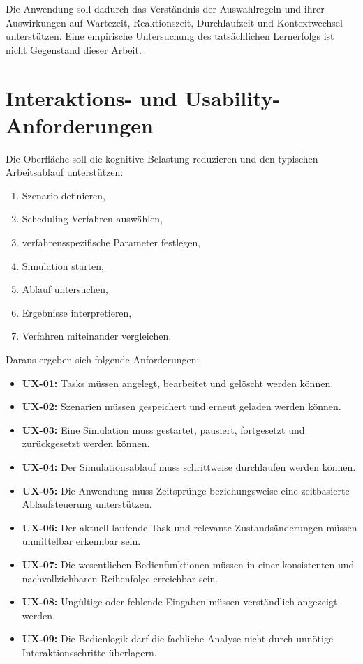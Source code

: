 Die Anwendung soll dadurch das Verständnis der Auswahlregeln und ihrer Auswirkungen auf Wartezeit, Reaktionszeit, Durchlaufzeit und Kontextwechsel unterstützen. Eine empirische Untersuchung des tatsächlichen Lernerfolgs ist nicht Gegenstand dieser Arbeit.

\section{Interaktions- und Usability-Anforderungen}

Die Oberfläche soll die kognitive Belastung reduzieren und den typischen Arbeitsablauf unterstützen:

\begin{enumerate}
    \item Szenario definieren,
    \item Scheduling-Verfahren auswählen,
    \item verfahrensspezifische Parameter festlegen,
    \item Simulation starten,
    \item Ablauf untersuchen,
    \item Ergebnisse interpretieren,
    \item Verfahren miteinander vergleichen.
\end{enumerate}

Daraus ergeben sich folgende Anforderungen:

\begin{itemize}
    \item \textbf{UX-01:} Tasks müssen angelegt, bearbeitet und gelöscht werden können.
    \item \textbf{UX-02:} Szenarien müssen gespeichert und erneut geladen werden können.
    \item \textbf{UX-03:} Eine Simulation muss gestartet, pausiert, fortgesetzt und zurückgesetzt werden können.
    \item \textbf{UX-04:} Der Simulationsablauf muss schrittweise durchlaufen werden können.
    \item \textbf{UX-05:} Die Anwendung muss Zeitsprünge beziehungsweise eine zeitbasierte Ablaufsteuerung unterstützen.
    \item \textbf{UX-06:} Der aktuell laufende Task und relevante Zustandsänderungen müssen unmittelbar erkennbar sein.
    \item \textbf{UX-07:} Die wesentlichen Bedienfunktionen müssen in einer konsistenten und nachvollziehbaren Reihenfolge erreichbar sein.
    \item \textbf{UX-08:} Ungültige oder fehlende Eingaben müssen verständlich angezeigt werden.
    \item \textbf{UX-09:} Die Bedienlogik darf die fachliche Analyse nicht durch unnötige Interaktionsschritte überlagern.
\end{itemize}

